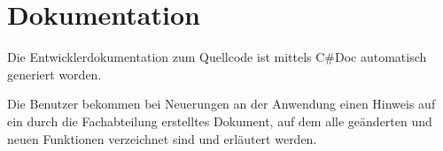 \clearpage
\section{Dokumentation}
\label{sec:Dokumentation}

Die Entwicklerdokumentation zum Quellcode ist mittels C\#Doc automatisch generiert worden.

Die Benutzer bekommen bei Neuerungen an der Anwendung einen Hinweis auf ein durch die Fachabteilung erstelltes Dokument, auf dem alle geänderten und neuen Funktionen verzeichnet sind und erläutert werden. 

